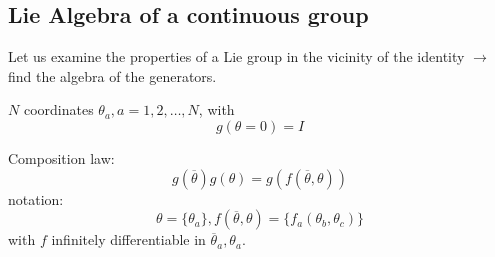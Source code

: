 \documentclass[12pt]{article}
\newcommand{\be}{\begin{equation}}
\newcommand{\ee}{\end{equation}}
\begin{document}
\subsection{Lie Algebra of a continuous group}

Let us examine the properties of a Lie group in the
vicinity of the identity \(\rightarrow\) find the algebra of the generators.


\(N\) coordinates \(\theta_{a}, a=1,2, \ldots, N\), with
\be
g(\theta=0)=I
\ee

Composition law:
\be
g(\overline{\theta}) g(\theta)=g(f(\overline{\theta}, \theta))
\ee
notation:
\be
\theta=\{\theta_{a}\}, f(\overline\theta, \theta)=\{f_{a}(\theta_{b}, \theta_{c})\}
\ee
with $f$ infinitely differentiable in $\overline{\theta}_a,\theta_a$.
\end{document}
